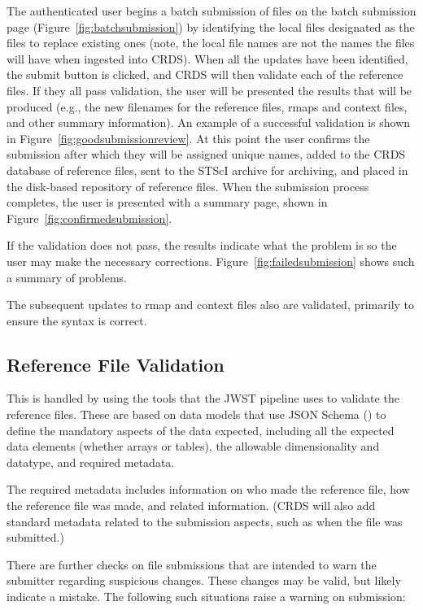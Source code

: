\documentclass[final,authoryear,5p,times,twocolumn]{elsarticle}
\begin{document}
The authenticated user begins a batch submission of files on the batch
submission page (Figure~\ref{fig:batchsubmission}) 
by identifying the local files designated as the 
files to replace existing ones (note, the local file names are not the 
names the files will have when ingested into CRDS). 
When all the updates have been identified, the submit button is clicked,
and CRDS will then validate each of the reference
files. If they all pass validation, the user will be presented
the results that will be produced (e.g., the new filenames for the reference
files, rmaps and context files, and other summary information). An example of a
successful validation is shown in Figure~\ref{fig:goodsubmissionreview}.
At this point the user confirms
the submission after which they will be assigned unique names, added to the
CRDS database of reference files, sent to the STScI archive for archiving, and
placed in the disk-based repository of reference files. When the submission
process completes, the user is presented with a summary page, shown in
Figure~\ref{fig:confirmedsubmission}.


If the validation does not pass, 
the results indicate what the problem is so the user may make the
necessary corrections. Figure~\ref{fig:failedsubmission}
shows such a summary of problems.

The subsequent updates to rmap and context files also are validated, primarily
to ensure the syntax is correct.

\subsection{Reference File Validation}

This is handled by using the tools that the JWST pipeline uses to validate the
reference files. These are based on data models that use JSON Schema
(\citealt{JSONSchemaCore, JSONSchemaValidation, JSONHyperSchema, JSONSchemaGuide})
to define the mandatory aspects of the data expected, including all the
expected data elements (whether arrays or tables), the allowable dimensionality
and datatype, and required metadata.

The required metadata includes information on who made the reference file, how
the reference file was made, and related information. (CRDS will also add
standard metadata related to the submission aspects, such as when the file was
submitted.)

There are further checks on file submissions that are intended to warn the submitter
regarding
suspicious changes. These changes may be valid, but likely indicate a mistake. The
following such situations raise a warning on submission:
\end{document}

